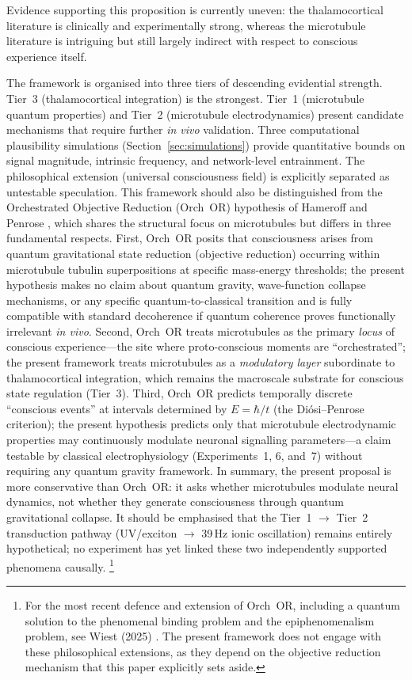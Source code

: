 \documentclass[10pt, a4paper, twocolumn]{article}
\begin{document}
Evidence supporting this proposition is currently uneven: the
thalamocortical literature is clinically and experimentally strong,
whereas the microtubule literature is intriguing but still largely
indirect with respect to conscious experience itself.

The framework is organised into three tiers of descending evidential
strength. Tier~3 (thalamocortical integration) is the strongest. Tier~1
(microtubule quantum properties) and Tier~2 (microtubule
electrodynamics) present candidate mechanisms that require further
\emph{in vivo} validation. Three computational plausibility simulations
(Section~\ref{sec:simulations}) provide quantitative bounds on signal
magnitude, intrinsic frequency, and network-level entrainment. The
philosophical extension (universal consciousness field) is explicitly
separated as untestable speculation.
This framework should also be distinguished from the Orchestrated
Objective Reduction (Orch~OR) hypothesis of Hameroff and Penrose
\cite{hameroff2014}, which shares the structural focus on
microtubules but differs in three fundamental respects.
First, Orch~OR posits that consciousness arises from quantum
gravitational state reduction (objective reduction) occurring
within microtubule tubulin superpositions at specific mass-energy
thresholds; the present hypothesis makes no claim about quantum
gravity, wave-function collapse mechanisms, or any specific
quantum-to-classical transition and is fully compatible with
standard decoherence if quantum coherence proves functionally
irrelevant \emph{in vivo}.
Second, Orch~OR treats microtubules as the primary \emph{locus}
of conscious experience---the site where proto-conscious moments
are ``orchestrated''; the present framework treats microtubules
as a \emph{modulatory layer} subordinate to thalamocortical
integration, which remains the macroscale substrate for conscious
state regulation (Tier~3).
Third, Orch~OR predicts temporally discrete ``conscious events''
at intervals determined by $E = \hbar / t$ (the Di\'{o}si--Penrose
criterion); the present hypothesis predicts only that microtubule
electrodynamic properties may continuously modulate neuronal
signalling parameters---a claim testable by classical
electrophysiology (Experiments~1, 6, and~7) without requiring
any quantum gravity framework.
In summary, the present proposal is more conservative than
Orch~OR: it asks whether microtubules modulate neural dynamics,
not whether they generate consciousness through quantum
gravitational collapse. It should be emphasised that the
Tier~1 $\to$ Tier~2 transduction pathway (UV/exciton
$\to$ 39\,Hz ionic oscillation) remains entirely
hypothetical; no experiment has yet linked these two
independently supported phenomena causally.%
\footnote{For the most recent defence and extension of Orch~OR,
including a quantum solution to the phenomenal binding problem
and the epiphenomenalism problem, see Wiest (2025)
\cite{wiest2025}. The present framework does not engage with
these philosophical extensions, as they depend on the objective
reduction mechanism that this paper explicitly sets aside.}
\end{document}
